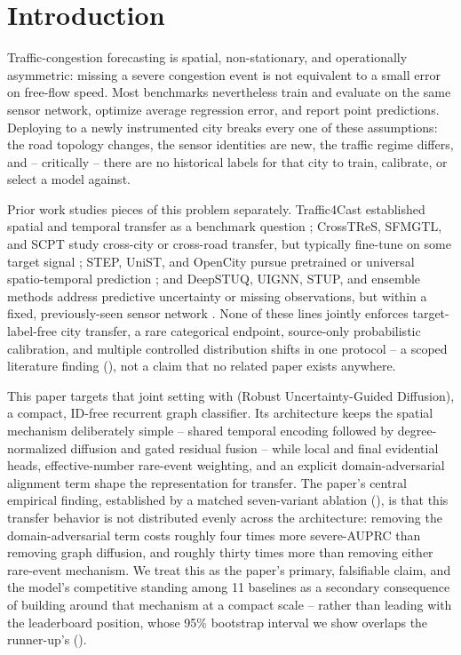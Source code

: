 \section{Introduction}
\label{sec:intro}

Traffic-congestion forecasting is spatial, non-stationary, and operationally asymmetric: missing a
severe congestion event is not equivalent to a small error on free-flow speed. Most benchmarks
nevertheless train and evaluate on the same sensor network, optimize average regression error, and
report point predictions. Deploying to a newly instrumented city breaks every one of these
assumptions: the road topology changes, the sensor identities are new, the traffic regime differs,
and -- critically -- there are no historical labels for that city to train, calibrate, or select a
model against.

Prior work studies pieces of this problem separately. Traffic4Cast established spatial and temporal
transfer as a benchmark question \citep{eichenberger2022traffic4cast21,neun2022traffic4cast22};
CrossTReS, SFMGTL, and SCPT study cross-city or cross-road transfer, but typically fine-tune on
some target signal \citep{jin2022crosstres,chen2024sfmgtl,prabowo2024scpt}; STEP, UniST, and
OpenCity pursue pretrained or universal spatio-temporal prediction
\citep{shao2022step,yuan2024unist,li2025opencity}; and DeepSTUQ, UIGNN, STUP, and ensemble methods
address predictive uncertainty or missing observations, but within a fixed, previously-seen sensor
network \citep{qian2022deepstuq,mei2023uignn,jin2024stup,mallick2024ensemble,yu2025uqgnn}. None of
these lines jointly enforces target-label-free city transfer, a rare categorical endpoint, source-only
probabilistic calibration, and multiple controlled distribution shifts in one protocol -- a scoped
literature finding (), not a claim that no related paper exists anywhere.

This paper targets that joint setting with \methodname{} (Robust Uncertainty-Guided Diffusion), a
compact, ID-free recurrent graph classifier. Its architecture keeps the spatial mechanism
deliberately simple -- shared temporal encoding followed by degree-normalized diffusion and gated
residual fusion -- while local and final evidential heads, effective-number rare-event weighting,
and an explicit domain-adversarial alignment term shape the representation for transfer. The paper's
central empirical finding, established by a matched seven-variant ablation
(), is that this transfer behavior is not distributed evenly across
the architecture: removing the domain-adversarial term costs roughly four times more severe-AUPRC
than removing graph diffusion, and roughly thirty times more than removing either rare-event
mechanism. We treat this as the paper's primary, falsifiable claim, and the model's competitive
standing among 11 baselines as a secondary consequence of building around that mechanism at a
compact scale -- rather than leading with the leaderboard position, whose 95\% bootstrap interval we
show overlaps the runner-up's ().

